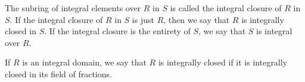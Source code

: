 The subring of integral elements over $R$ in $S$ is called the integral
closure of $R$ in $S$. If the integral closure  of $R$ in $S$ is just $R$, then
we say that $R$ is integrally closed in $S$. If the integral closure is the
entirety of $S$, we say that $S$ is integral over $R$.

If $R$ is an integral domain, we say that $R$ is integrally closed if it is
integrally closed in its field of fractions.
